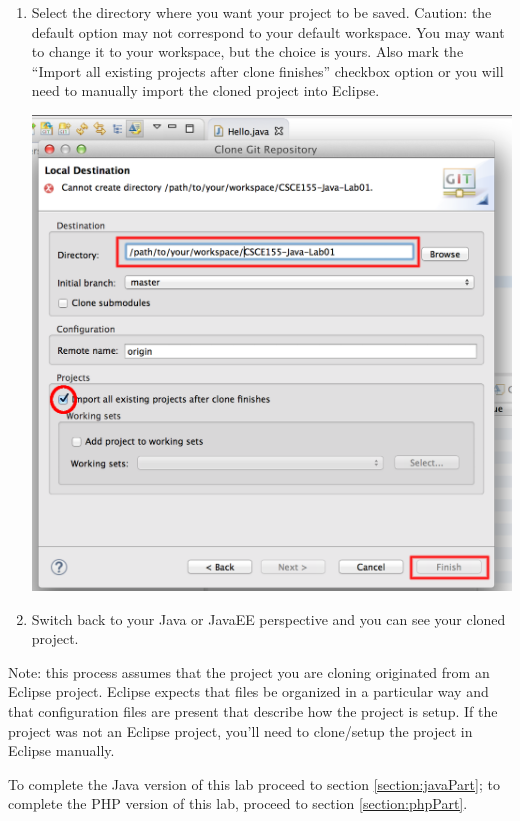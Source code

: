 \documentclass[12pt]{scrartcl}
\begin{document}
\begin{enumerate}
\begin{center}
	\end{center}
  \item Select the directory where you want your project to be saved.  Caution: the default
  	option may not correspond to your default workspace.  You may want to change
	it to your workspace, but the choice is yours.  Also mark the ``Import all existing 
	projects after clone finishes'' checkbox option or you will need
  	to manually import the cloned project into Eclipse.
  	\begin{center}
	\includegraphics[scale=0.35]{images/eclipseCloneDialogCMarkUp}
	\end{center}
  \item Switch back to your Java or JavaEE perspective and you can see 
  	your cloned project.  
\end{enumerate}

Note: this process assumes that the project you are cloning originated 
from an Eclipse project.  Eclipse expects that files be organized in a particular way and that configuration files are present that describe 
how the project is setup.  If the project was not an Eclipse project, 
you'll need to clone/setup the project in Eclipse manually.

{} To complete the Java version of this lab proceed to 
section \ref{section:javaPart}; to complete the PHP version of this lab, 
proceed to section \ref{section:phpPart}.
\end{document}

